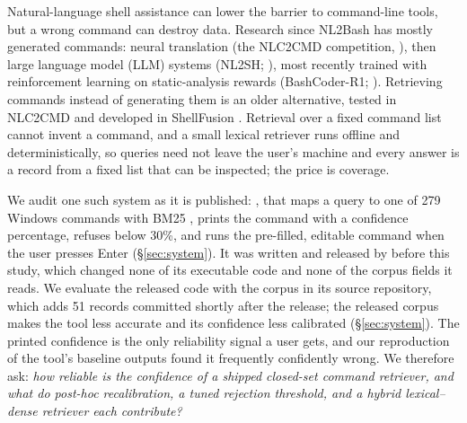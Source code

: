Natural-language shell assistance can lower the barrier to command-line tools, but a wrong command can
destroy data. Research since NL2Bash \citep{lin-etal-2018-nl2bash} has mostly generated commands: neural
translation (the NLC2CMD competition, \citealp{agarwal2021nlc2cmd}), then large language model (LLM)
systems (NL2SH; \citealp{westenfelder2025nl2sh}), most recently trained with reinforcement learning on
static-analysis rewards (BashCoder-R1; \citealp{yu2026bashcoderr1}). Retrieving commands instead of generating
them is an older alternative, tested in NLC2CMD \citep{agarwal2021nlc2cmd} and developed in ShellFusion
\citep{zhang2022shellfusion}. Retrieval over a fixed command list cannot invent a command, and a small lexical retriever runs offline and
deterministically, so queries need not leave the user's machine and every answer is a record from a fixed
list that can be inspected; the price is coverage.

We audit one such system as it is published: \toolname{}\toolnote{}, \toolhost{} that maps a query to one of 279
Windows commands with BM25 \citep{robertson2009bm25}, prints the command with a confidence percentage,
refuses below 30\%, and runs the pre-filled, editable command when the user presses Enter (\S\ref{sec:system}).
It was written and released by \authorrel{} before this study, which changed none of its executable code
and none of the corpus fields it reads. We evaluate the released code with the corpus in its source repository,
which adds 51 records committed shortly after the release; the released corpus makes the tool less accurate and
its confidence less calibrated (\S\ref{sec:system}).
The printed confidence is the only reliability signal a user gets, and our reproduction of the tool's baseline
outputs found it frequently confidently wrong. We therefore ask: \emph{how reliable is the confidence of a
shipped closed-set command retriever, and what do post-hoc recalibration, a tuned rejection threshold, and a
hybrid lexical--dense retriever each contribute?}


